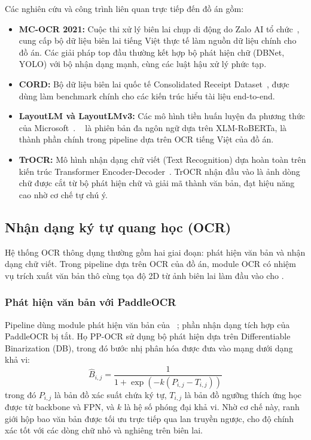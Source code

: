 Các nghiên cứu và công trình liên quan trực tiếp đến đồ án gồm:
\begin{itemize}
  \item \textbf{MC-OCR 2021:} Cuộc thi xử lý biên lai chụp di động do Zalo AI tổ chức~\cite{mcocr2021}, cung cấp bộ dữ liệu biên lai tiếng Việt thực tế làm nguồn dữ liệu chính cho đồ án. Các giải pháp top đầu thường kết hợp bộ phát hiện chữ (DBNet, YOLO) với bộ nhận dạng mạnh, cùng các luật hậu xử lý phức tạp.
  \item \textbf{CORD:} Bộ dữ liệu biên lai quốc tế Consolidated Receipt Dataset~\cite{park2019cord}, được dùng làm benchmark chính cho các kiến trúc hiểu tài liệu end-to-end.
  \item \textbf{LayoutLM và LayoutLMv3:} Các mô hình tiền huấn luyện đa phương thức của Microsoft~\cite{xu2020layoutlm, huang2022layoutlmv3}. ~\cite{xu2021layoutxlm} là phiên bản đa ngôn ngữ dựa trên XLM-RoBERTa, là thành phần chính trong pipeline dựa trên OCR tiếng Việt của đồ án.
  \item \textbf{TrOCR:} Mô hình nhận dạng chữ viết (Text Recognition) dựa hoàn toàn trên kiến trúc Transformer Encoder-Decoder~\cite{li2023trocr}. TrOCR nhận đầu vào là ảnh dòng chữ được cắt từ bộ phát hiện chữ và giải mã thành văn bản, đạt hiệu năng cao nhờ cơ chế tự chú ý.
\end{itemize}

\subsection{Nhận dạng ký tự quang học (OCR)}
\label{subsec:ocr}

Hệ thống OCR thông dụng thường gồm hai giai đoạn: phát hiện văn bản và nhận dạng chữ viết. Trong pipeline dựa trên OCR của đồ án, module OCR có nhiệm vụ trích xuất văn bản thô cùng tọa độ 2D từ ảnh biên lai làm đầu vào cho .

\subsubsection{Phát hiện văn bản với PaddleOCR}
\label{subsubsec:paddleocr}

Pipeline dùng module phát hiện văn bản của ~\cite{du2020ppocr}; phần nhận dạng tích hợp của PaddleOCR bị tắt. Họ PP-OCR sử dụng bộ phát hiện dựa trên Differentiable Binarization (DB), trong đó bước nhị phân hóa được đưa vào mạng dưới dạng khả vi:
\begin{equation}
  \hat{B}_{i,j} = \frac{1}{1 + \exp(-k(P_{i,j} - T_{i,j}))}
  \label{eq:db_binarization}
\end{equation}
trong đó $P_{i,j}$ là bản đồ xác suất chứa ký tự, $T_{i,j}$ là bản đồ ngưỡng thích ứng học được từ backbone và FPN, và $k$ là hệ số phóng đại khả vi. Nhờ cơ chế này, ranh giới hộp bao văn bản được tối ưu trực tiếp qua lan truyền ngược, cho độ chính xác tốt với các dòng chữ nhỏ và nghiêng trên biên lai.

